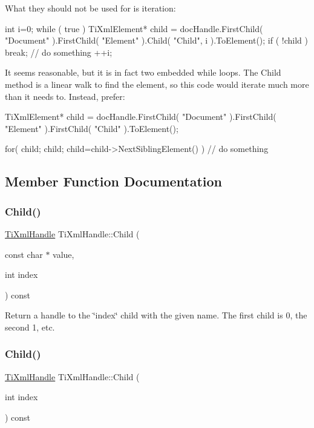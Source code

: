 What they should not be used for is iteration\+:

\begin{DoxyVerb}int i=0; 
while ( true )
{
    TiXmlElement* child = docHandle.FirstChild( "Document" ).FirstChild( "Element" ).Child( "Child", i ).ToElement();
    if ( !child )
        break;
    // do something
    ++i;
}
\end{DoxyVerb}


It seems reasonable, but it is in fact two embedded while loops. The Child method is a linear walk to find the element, so this code would iterate much more than it needs to. Instead, prefer\+:

\begin{DoxyVerb}TiXmlElement* child = docHandle.FirstChild( "Document" ).FirstChild( "Element" ).FirstChild( "Child" ).ToElement();

for( child; child; child=child->NextSiblingElement() )
{
    // do something
}
\end{DoxyVerb}
 

\subsection{Member Function Documentation}
\hypertarget{class_ti_xml_handle_a9903b035444ee36450fe00ede403f920}{}\label{class_ti_xml_handle_a9903b035444ee36450fe00ede403f920} 
\subsubsection{\texorpdfstring{Child()}{Child()}\hspace{0.1cm}{\footnotesize\ttfamily [1/2]}}
{\footnotesize\ttfamily \hyperlink{class_ti_xml_handle}{Ti\+Xml\+Handle} Ti\+Xml\+Handle\+::\+Child (\begin{DoxyParamCaption}\item[{const char $\ast$}]{value,  }\item[{int}]{index }\end{DoxyParamCaption}) const}

Return a handle to the \char`\"{}index\char`\"{} child with the given name. The first child is 0, the second 1, etc. \hypertarget{class_ti_xml_handle_a32585942abb28e03eea9c5223f38a659}{}\label{class_ti_xml_handle_a32585942abb28e03eea9c5223f38a659} 
\subsubsection{\texorpdfstring{Child()}{Child()}\hspace{0.1cm}{\footnotesize\ttfamily [2/2]}}
{\footnotesize\ttfamily \hyperlink{class_ti_xml_handle}{Ti\+Xml\+Handle} Ti\+Xml\+Handle\+::\+Child (\begin{DoxyParamCaption}\item[{int}]{index }\end{DoxyParamCaption}) const}


